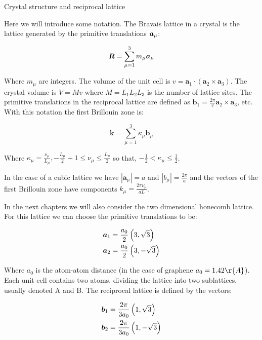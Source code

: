 \begin{subappendices}
\begin{section}{Crystal structure and reciprocal lattice}
\label{AP1A}

Here we will introduce some notation. The Bravais lattice in a crystal is the lattice generated by the primitive translations $\boldsymbol{a}_\mu$:

\begin{equation}
\boldsymbol{R} = \sum_{\mu=1}^3 m_\mu \boldsymbol{a}_\mu
\end{equation}

Where $m_\mu$ are integers. The volume of the unit cell is $v = \textbf{a}_1 \cdot (\textbf{a}_2 \times \textbf{a}_3)$. The crystal volume is $V = Mv$ where $M = L_1 L_2 L_3$ is the number of lattice sites. The primitive translations in the reciprocal lattice are defined as $\textbf{b}_1 = \frac{2 \pi}{v}\textbf{a}_2 \times \textbf{a}_3$, etc. With this notation the first Brillouin zone is:

\begin{equation}
\textbf{k} = \sum_{\mu=1}^3 \kappa_\mu \textbf{b}_\mu
\end{equation}

Where $\kappa_\mu = \frac{\nu_\mu}{L_\mu}, -\frac{L_\mu}{2}+1 \leq \nu_\mu \leq \frac{L_\mu}{2}$ so that, $-\frac{1}{2} < \kappa_\mu \leq \frac{1}{2}$. 

In the case of a cubic lattice we have $|\textbf{a}_\mu| = a$ and $|b_\mu| = \frac{2\pi}{a}$ and the vectors of the first Brillouin zone have components $k_\mu = \frac{2 \pi \nu_\mu}{aL}$.

In the next chapters we will also consider the two dimensional honecomb lattice. For this lattice we can choose the primitive translations to be:

\begin{align}
\boldsymbol{a}_1 &= \frac{a_0}{2} \left(3, \sqrt{3} \right) \\
\boldsymbol{a}_2 &= \frac{a_0}{2} \left(3, -\sqrt{3} \right)
\end{align}

Where $a_0$ is the atom-atom distance (in the case of graphene $a_0 = 1.42 \r{A}$). Each unit cell contains two atoms, dividing the lattice into two sublattices, usually denoted A and B. The reciprocal lattice is defined by the vectors:

\begin{align}
\boldsymbol{b}_1 &= \frac{2\pi}{3a_0} \left(1, \sqrt{3} \right) \\
\boldsymbol{b}_2 &= \frac{2\pi}{3a_0} \left(1, -\sqrt{3} \right)
\end{align}


\end{section}
\end{subappendices}
